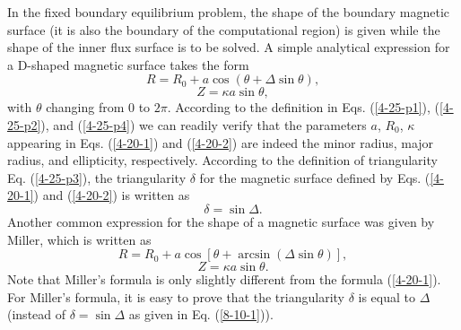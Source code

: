 \documentclass{llncs}
\begin{document}
In the fixed boundary equilibrium problem, the shape of the boundary magnetic
surface (it is also the boundary of the computational region) is given while
the shape of the inner flux surface is to be solved. A simple analytical
expression for a D-shaped magnetic surface takes the form
\begin{equation}
  \label{4-20-1} R = R_0 + a \cos (\theta + \Delta \sin \theta),
\end{equation}
\begin{equation}
  \label{4-20-2} Z = \kappa a \sin \theta,
\end{equation}
with $\theta$ changing from $0$ to $2 \pi$. According to the definition in
Eqs. (\ref{4-25-p1}), (\ref{4-25-p2}), and (\ref{4-25-p4}) we can readily
verify that the parameters $a$, $R_0$, $\kappa$ appearing in Eqs.
(\ref{4-20-1}) and (\ref{4-20-2}) are indeed the minor radius, major radius,
and ellipticity, respectively. According to the definition of triangularity
Eq. (\ref{4-25-p3}), the triangularity $\delta$ for the magnetic surface
defined by Eqs. (\ref{4-20-1}) and (\ref{4-20-2}) is written as
\begin{equation}
  \label{8-10-1} \delta = \sin \Delta .
\end{equation}
Another common expression for the shape of a magnetic surface was given by
Miller{\cite{chen2010,miller1998}}, which is written as
\begin{equation}
  \label{10-31-e1} R = R_0 + a \cos [\theta + \arcsin (\Delta \sin \theta)],
\end{equation}
\begin{equation}
  \label{10-31-e2} Z = \kappa a \sin \theta .
\end{equation}
Note that Miller's formula is only slightly different from the formula
(\ref{4-20-1}). For Miller's formula, it is easy to prove that the
triangularity $\delta$ is equal to $\Delta$ (instead of $\delta = \sin \Delta$
as given in Eq. (\ref{8-10-1})).
\end{document}
